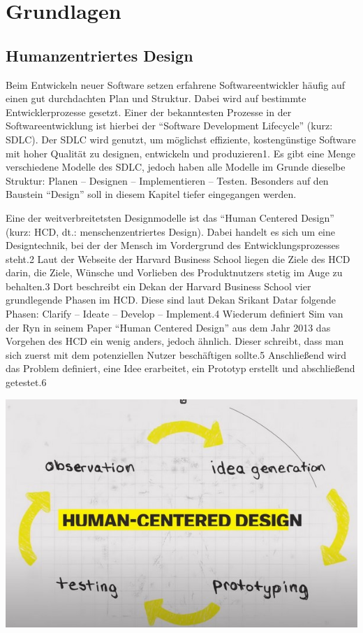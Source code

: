 
\chapter{Grundlagen}
\label{chapter:3}

\section{Humanzentriertes Design}

Beim Entwickeln neuer Software setzen erfahrene Softwareentwickler häufig auf einen gut durchdachten Plan und Struktur. Dabei wird auf bestimmte Entwicklerprozesse gesetzt. Einer der bekanntesten Prozesse in der Softwareentwicklung ist hierbei der “Software Development Lifecycle” (kurz: SDLC). Der SDLC wird genutzt, um möglichst effiziente, kostengünstige Software mit hoher Qualität zu designen, entwickeln und produzieren1. Es gibt eine Menge verschiedene Modelle des SDLC, jedoch haben alle Modelle im Grunde dieselbe Struktur: Planen – Designen – Implementieren – Testen. Besonders auf den Baustein “Design” soll in diesem Kapitel tiefer eingegangen werden.

Eine der weitverbreitetsten Designmodelle ist das “Human Centered Design” (kurz: HCD, dt.: menschenzentriertes Design).  Dabei handelt es sich um eine Designtechnik, bei der der Mensch im Vordergrund des Entwicklungsprozesses steht.2 Laut der Webseite der Harvard Business School liegen die Ziele des HCD darin, die Ziele, Wünsche und Vorlieben des Produktnutzers stetig im Auge zu behalten.3 Dort beschreibt ein Dekan der Harvard Business School vier grundlegende Phasen im HCD. Diese sind laut Dekan Srikant Datar folgende Phasen: Clarify – Ideate – Develop – Implement.4 Wiederum definiert Sim van der Ryn in seinem Paper “Human Centered Design” aus dem Jahr 2013 das Vorgehen des HCD ein wenig anders, jedoch ähnlich. Dieser schreibt, dass man sich zuerst mit dem potenziellen Nutzer beschäftigen sollte.5 Anschließend wird das Problem definiert, eine Idee erarbeitet, ein Prototyp erstellt und abschließend getestet.6

\includegraphics[width=1\textwidth]{images/03/HCD.jpg}


